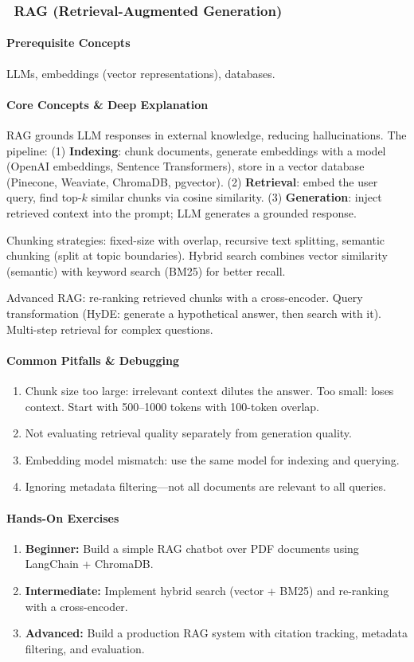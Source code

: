 \documentclass[11pt, a4paper, oneside]{report}
\newcommand{\mustmaster}[1]{\subsubsection{\texorpdfstring{\fcolorbox{blue!40!black}{blue!8}{\footnotesize\bfseries\color{blue!40!black} MUST MASTER}~#1}{#1}}}
\begin{document}
\mustmaster{RAG (Retrieval-Augmented Generation)}

\paragraph{Prerequisite Concepts} LLMs, embeddings (vector representations), databases.

\paragraph{Core Concepts \& Deep Explanation} RAG grounds LLM responses in external knowledge, reducing hallucinations. The pipeline: (1) \textbf{Indexing}: chunk documents, generate embeddings with a model (OpenAI embeddings, Sentence Transformers), store in a vector database (Pinecone, Weaviate, ChromaDB, pgvector). (2) \textbf{Retrieval}: embed the user query, find top-$k$ similar chunks via cosine similarity. (3) \textbf{Generation}: inject retrieved context into the prompt; LLM generates a grounded response.

Chunking strategies: fixed-size with overlap, recursive text splitting, semantic chunking (split at topic boundaries). Hybrid search combines vector similarity (semantic) with keyword search (BM25) for better recall.

Advanced RAG: re-ranking retrieved chunks with a cross-encoder. Query transformation (HyDE: generate a hypothetical answer, then search with it). Multi-step retrieval for complex questions.

\paragraph{Common Pitfalls \& Debugging}
\begin{enumerate}[leftmargin=*]
\item Chunk size too large: irrelevant context dilutes the answer. Too small: loses context. Start with 500--1000 tokens with 100-token overlap.
\item Not evaluating retrieval quality separately from generation quality.
\item Embedding model mismatch: use the same model for indexing and querying.
\item Ignoring metadata filtering---not all documents are relevant to all queries.
\end{enumerate}

\paragraph{Hands-On Exercises}
\begin{enumerate}[leftmargin=*]
\item \textbf{Beginner:} Build a simple RAG chatbot over PDF documents using LangChain + ChromaDB.
\item \textbf{Intermediate:} Implement hybrid search (vector + BM25) and re-ranking with a cross-encoder.
\item \textbf{Advanced:} Build a production RAG system with citation tracking, metadata filtering, and evaluation.
\end{enumerate}
\end{document}

